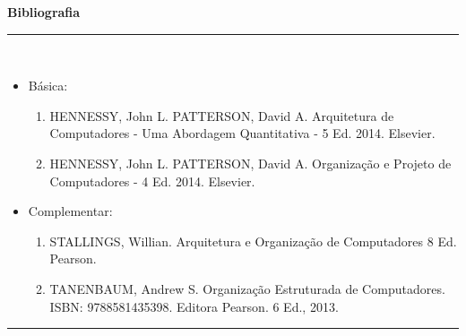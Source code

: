 \begin{center}\textbf{Bibliografia}\end{center}
\vspace{-5mm}
\noindent\rule{16.5cm}{0.4pt}
\\
\begin{itemize} 
  \item Básica:
	\begin{enumerate}
	\item HENNESSY, John L. PATTERSON, David A. Arquitetura de Computadores - Uma Abordagem Quantitativa - 5 Ed. 2014. Elsevier.
	\item HENNESSY, John L. PATTERSON, David A. Organização e Projeto de Computadores - 4 Ed. 2014. Elsevier.
	\end{enumerate}
  \item Complementar:
	\begin{enumerate} 
	\item STALLINGS, Willian. Arquitetura e Organização de Computadores 8 Ed. Pearson.
	\item TANENBAUM, Andrew S. Organização Estruturada de Computadores. ISBN: 9788581435398. Editora Pearson. 6 Ed., 2013.
	\end{enumerate}
\end{itemize}
\noindent\rule{16.5cm}{0.4pt}\\
\\
